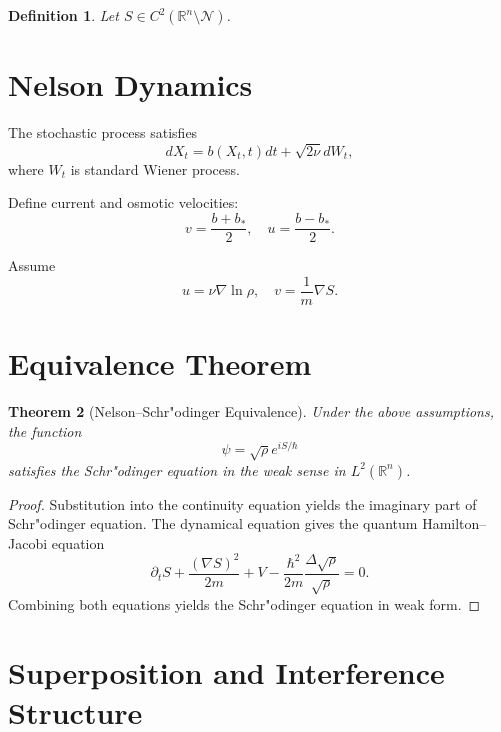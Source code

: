 \documentclass[11pt]{article}
\newtheorem{theorem}{Theorem}[section]
\newtheorem{definition}[theorem]{Definition}
\begin{document}
\begin{definition}
Let $S \in C^2(\mathbb{R}^n \setminus \mathcal{N})$.
\end{definition}

\section{Nelson Dynamics}

The stochastic process satisfies
\begin{equation}
dX_t = b(X_t,t) dt + \sqrt{2\nu} dW_t,
\end{equation}
where $W_t$ is standard Wiener process.

Define current and osmotic velocities:
\begin{equation}
v = \frac{b+b_*}{2}, \quad u = \frac{b-b_*}{2}.
\end{equation}

Assume
\begin{equation}
u = \nu \nabla \ln \rho, \quad v = \frac{1}{m} \nabla S.
\end{equation}

\section{Equivalence Theorem}

\begin{theorem}[Nelson--Schr"odinger Equivalence]
Under the above assumptions, the function
\begin{equation}
\psi = \sqrt{\rho} e^{iS/\hbar}
\end{equation}
satisfies the Schr"odinger equation in the weak sense in $L^2(\mathbb{R}^n)$.
\end{theorem}

\begin{proof}
Substitution into the continuity equation yields the imaginary part of Schr"odinger equation. The dynamical equation gives the quantum Hamilton--Jacobi equation
\begin{equation}
\partial_t S + \frac{(\nabla S)^2}{2m} + V - \frac{\hbar^2}{2m} \frac{\Delta \sqrt{\rho}}{\sqrt{\rho}} = 0.
\end{equation}
Combining both equations yields the Schr"odinger equation in weak form.
\end{proof}

\section{Superposition and Interference Structure}
\end{document}
